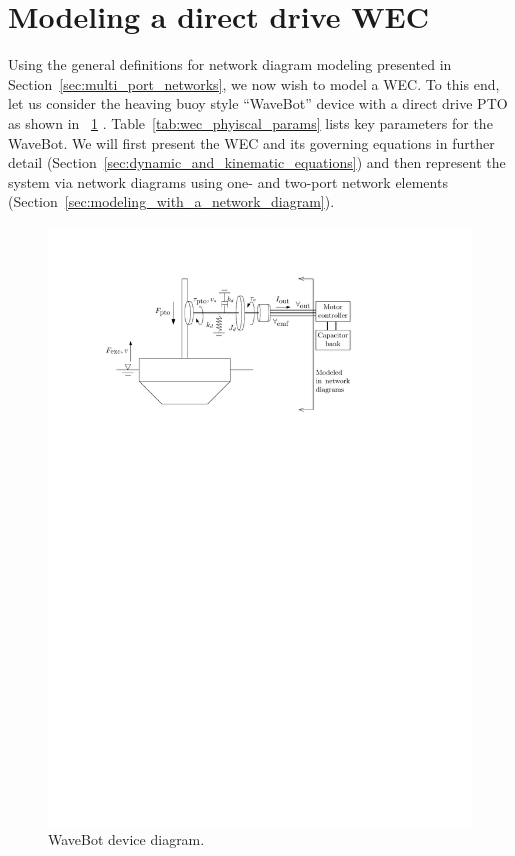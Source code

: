 \documentclass[lettersize,journal]{IEEEtran}
\begin{document}
\section{Modeling a direct drive WEC}\label{sec:modeling_a_direct_drive_wec}
Using the general definitions for network diagram modeling presented in Section~\ref{sec:multi_port_networks}, we now wish to model a WEC.
To this end, let us consider the heaving buoy style ``WaveBot'' device with a direct drive PTO as shown in \figurename~\ref{fig:wec_as_multiport_phyiscal_diagram} \cite{Forbush:2024aa}.
Table~\ref{tab:wec_phyiscal_params} lists key parameters for the WaveBot.
We will first present the WEC and its governing equations in further detail (Section~\ref{sec:dynamic_and_kinematic_equations}) and then represent the system via network diagrams using one- and two-port network elements (Section~\ref{sec:modeling_with_a_network_diagram}).

\begin{figure}[tb]
        \centering
        \includegraphics[width=1\columnwidth]{wec_as_multiport_phyiscal_diagram.pdf}
        \caption{WaveBot device diagram.}
        \label{fig:wec_as_multiport_phyiscal_diagram}
\end{figure}
\end{document}
